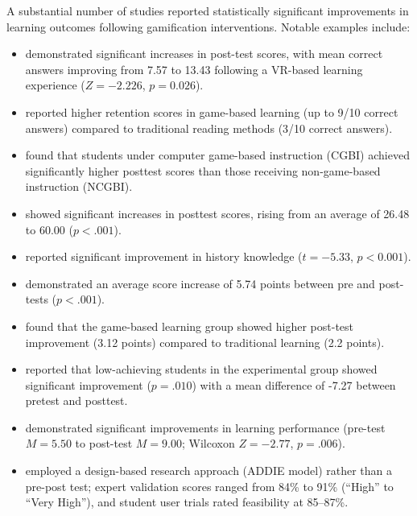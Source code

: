 \documentclass[a4paper,fleqn]{cas-sc}
\begin{document}
A substantial number of studies reported statistically significant improvements in learning outcomes following gamification interventions. Notable examples include:

\begin{itemize}[noitemsep]
 \item \citet{1Barbatsis201159} demonstrated significant increases in post-test scores, with mean correct answers improving from 7.57 to 13.43 following a VR-based learning experience ($Z=-2.226$, $p=0.026$).
 
 \item \citet{2Mahamarowi2023133} reported higher retention scores in game-based learning (up to 9/10 correct answers) compared to traditional reading methods (3/10 correct answers).
 
 \item \citet{8Yu2014} found that students under computer game-based instruction (CGBI) achieved significantly higher posttest scores than those receiving non-game-based instruction (NCGBI).
 
 \item \citet{9Lin2018} showed significant increases in posttest scores, rising from an average of 26.48 to 60.00 ($p<.001$).
 
 \item \citet{16Chen201447} reported significant improvement in history knowledge ($t=-5.33$, $p<0.001$).
 
 \item \citet{19Chou2019} demonstrated an average score increase of 5.74 points between pre and post-tests ($p<.001$).
 
 \item \citet{24Ghannem2019} found that the game-based learning group showed higher post-test improvement (3.12 points) compared to traditional learning (2.2 points).
 
 \item \citet{52Lin2011265} reported that low-achieving students in the experimental group showed significant improvement ($p=.010$) with a mean difference of -7.27 between pretest and posttest.
 
 \item \citet{63Liu2021} demonstrated significant improvements in learning performance (pre-test $M=5.50$ to post-test $M=9.00$; Wilcoxon $Z=-2.77$, $p=.006$).
 
 \item \citet{77Ramansyah2021} employed a design-based research approach (ADDIE model) rather than a pre-post test; expert validation scores ranged from 84\% to 91\% (``High'' to ``Very High''), and student user trials rated feasibility at 85--87\%.
\end{itemize}
\end{document}
